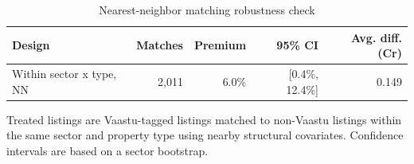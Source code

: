 \begin{table}[!htbp]
\centering
\caption{Nearest-neighbor matching robustness check}
\label{tab:matching}
{\small\setlength{\tabcolsep}{4pt}
\begin{tabular}{lrrrr}
\toprule
Design & Matches & Premium & 95\% CI & Avg. diff. (Cr) \\
\midrule
Within sector x type, NN & 2,011 & 6.0\% & [0.4\%, 12.4\%] & 0.149 \\
\bottomrule
\end{tabular}

}
\vspace{0.3em}
\par\begin{minipage}{0.95\linewidth}\footnotesize Treated listings are Vaastu-tagged listings matched to non-Vaastu listings within the same sector and property type using nearby structural covariates. Confidence intervals are based on a sector bootstrap.\end{minipage}
\end{table}
